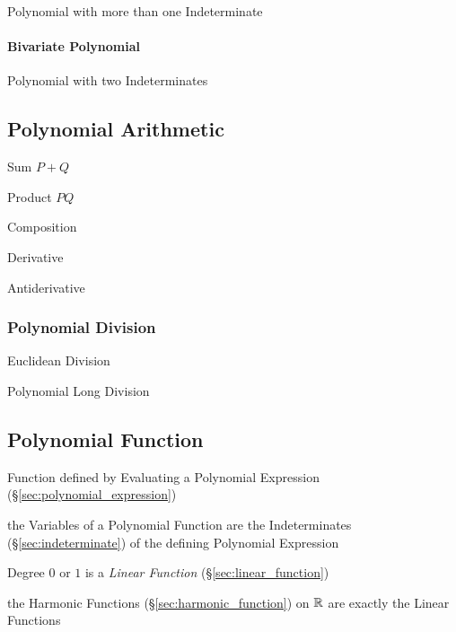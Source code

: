 Polynomial with more than one Indeterminate



\paragraph{Bivariate Polynomial}\label{sec:bivariate_polynomial}\hfill

Polynomial with two Indeterminates



\subsection{Polynomial Arithmetic}\label{sec:polynomial_arithmetic}

Sum $P + Q$

Product $P Q$

Composition

Derivative

Antiderivative



\subsubsection{Polynomial Division}\label{sec:polynomial_division}

Euclidean Division

Polynomial Long Division



\subsection{Polynomial Function}\label{sec:polynomial_function}

Function defined by Evaluating a Polynomial Expression
(\S\ref{sec:polynomial_expression})

the Variables of a Polynomial Function are the Indeterminates
(\S\ref{sec:indeterminate}) of the defining Polynomial Expression

Degree $0$ or $1$ is a \emph{Linear Function} (\S\ref{sec:linear_function})

the Harmonic Functions (\S\ref{sec:harmonic_function}) on $\mathbb{R}$ are
exactly the Linear Functions

